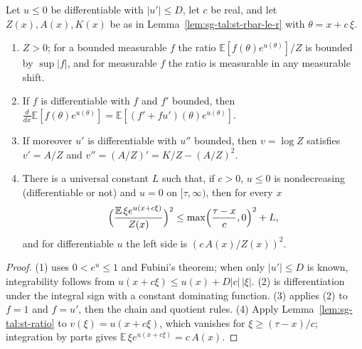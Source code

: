 \begin{lemma}\label{lem:sg-tal:st-smoothing}
  \leanok
Let $u\le0$ be differentiable with $|u'|\le D$, let $c$ be real, and let $Z(x),A(x),K(x)$ be as in
Lemma~\ref{lem:sg-tal:st-rbar-le-r} with $\theta=x+c\,\xi$.
\begin{enumerate}
\item $Z>0$; for a bounded measurable $f$ the ratio $\mathbb E[f(\theta)e^{u(\theta)}]/Z$ is bounded by
$\sup|f|$, and for measurable $f$ the ratio is measurable in any measurable shift.
\item If $f$ is differentiable with $f$ and $f'$ bounded, then
$\frac{d}{dx}\mathbb E[f(\theta)e^{u(\theta)}]=\mathbb E[(f'+fu')(\theta)e^{u(\theta)}]$.
\item If moreover $u'$ is differentiable with $u''$ bounded, then $v=\log Z$ satisfies $v'=A/Z$ and
$v''=(A/Z)'=K/Z-(A/Z)^2$.
\item There is a universal constant $L$ such that, if $c>0$, $u\le0$ is nondecreasing (differentiable or
not) and $u=0$ on $[\tau,\infty)$, then for every $x$
\[
\Bigl(\frac{\mathbb E\,\xi e^{u(x+c\xi)}}{Z(x)}\Bigr)^2\le\max\Bigl(\frac{\tau-x}{c},0\Bigr)^2+L ,
\]
and for differentiable $u$ the left side is $(c\,A(x)/Z(x))^2$.
\end{enumerate}
\end{lemma}
\begin{proof}
  \leanok
(1) uses $0<e^{u}\le1$ and Fubini's theorem; when only $|u'|\le D$ is known, integrability follows from
$u(x+c\xi)\le u(x)+D|c|\,|\xi|$. (2) is differentiation under the integral sign with a constant
dominating function. (3) applies (2) to $f=1$ and $f=u'$, then the chain and quotient rules. (4) Apply
Lemma~\ref{lem:sg-tal:st-ratio} to $v(\xi)=u(x+c\xi)$, which vanishes for $\xi\ge(\tau-x)/c$; integration by
parts gives $\mathbb E\,\xi e^{u(x+c\xi)}=c\,A(x)$.
\end{proof}

